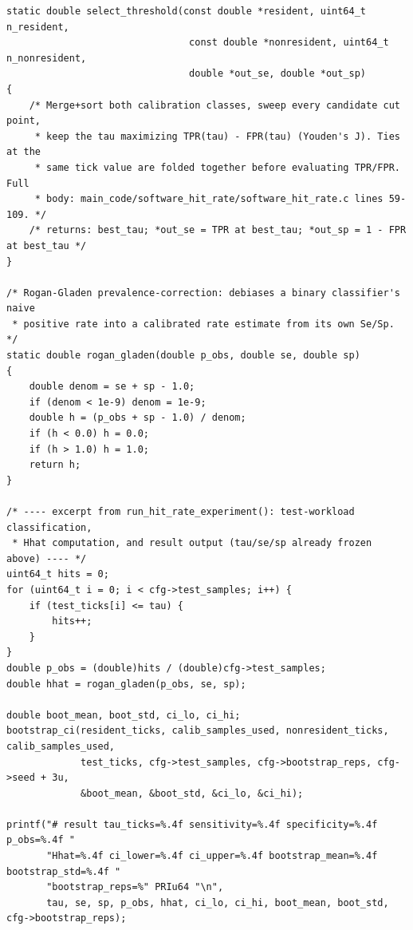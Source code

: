 \documentclass{article}
\begin{document}
\begin{lstlisting}[caption={Software-only cache hit-rate estimator: threshold selection (Youden's J), Rogan--Gladen debiasing, and the test-workload classification/output tail. Target property: timing-derived cache hit rate $\widehat{H}$. Architecture: portable common code. File: \texttt{main\_code/software\_hit\_rate/software\_hit\_rate.c}.},label={lst:hitrate}]
static double select_threshold(const double *resident, uint64_t n_resident,
                                const double *nonresident, uint64_t n_nonresident,
                                double *out_se, double *out_sp)
{
    /* Merge+sort both calibration classes, sweep every candidate cut point,
     * keep the tau maximizing TPR(tau) - FPR(tau) (Youden's J). Ties at the
     * same tick value are folded together before evaluating TPR/FPR. Full
     * body: main_code/software_hit_rate/software_hit_rate.c lines 59-109. */
    /* returns: best_tau; *out_se = TPR at best_tau; *out_sp = 1 - FPR at best_tau */
}

/* Rogan-Gladen prevalence-correction: debiases a binary classifier's naive
 * positive rate into a calibrated rate estimate from its own Se/Sp. */
static double rogan_gladen(double p_obs, double se, double sp)
{
    double denom = se + sp - 1.0;
    if (denom < 1e-9) denom = 1e-9;
    double h = (p_obs + sp - 1.0) / denom;
    if (h < 0.0) h = 0.0;
    if (h > 1.0) h = 1.0;
    return h;
}

/* ---- excerpt from run_hit_rate_experiment(): test-workload classification,
 * Hhat computation, and result output (tau/se/sp already frozen above) ---- */
uint64_t hits = 0;
for (uint64_t i = 0; i < cfg->test_samples; i++) {
    if (test_ticks[i] <= tau) {
        hits++;
    }
}
double p_obs = (double)hits / (double)cfg->test_samples;
double hhat = rogan_gladen(p_obs, se, sp);

double boot_mean, boot_std, ci_lo, ci_hi;
bootstrap_ci(resident_ticks, calib_samples_used, nonresident_ticks, calib_samples_used,
             test_ticks, cfg->test_samples, cfg->bootstrap_reps, cfg->seed + 3u,
             &boot_mean, &boot_std, &ci_lo, &ci_hi);

printf("# result tau_ticks=%.4f sensitivity=%.4f specificity=%.4f p_obs=%.4f "
       "Hhat=%.4f ci_lower=%.4f ci_upper=%.4f bootstrap_mean=%.4f bootstrap_std=%.4f "
       "bootstrap_reps=%" PRIu64 "\n",
       tau, se, sp, p_obs, hhat, ci_lo, ci_hi, boot_mean, boot_std, cfg->bootstrap_reps);
\end{lstlisting}
\end{document}
